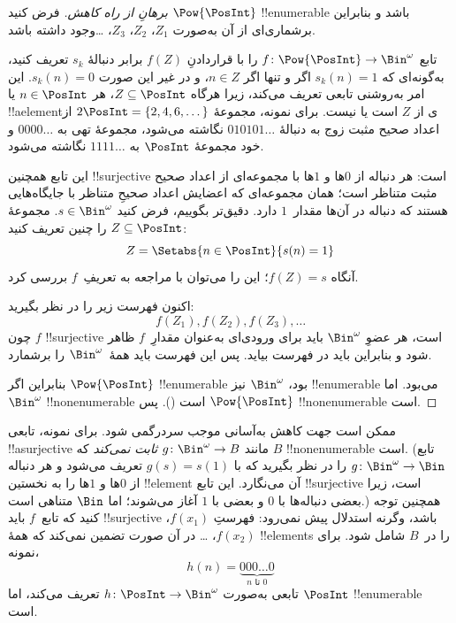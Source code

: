 \documentclass[../../../include/open-logic-section]{subfiles}
\begin{document}
\begin{proof}[برهانِ {} از راه کاهش]
فرض کنید $\Pow{\PosInt}$ !!{enumerable} باشد و بنابراین برشماری‌ای از
آن به‌صورت $Z_{1}$، $Z_{2}$، $Z_{3}$، \dots وجود داشته باشد.

تابع $f \colon \Pow{\PosInt} \to \Bin^\omega$ را با قراردادنِ
$f(Z)$ برابر دنبالهٔ $s_{k}$ تعریف کنید، به‌گونه‌ای که $s_{k}(n) = 1$ اگر و تنها
اگر $n \in Z$، و در غیر این صورت $s_k(n) = 0$. این امر به‌روشنی تابعی
تعریف می‌کند، زیرا هرگاه $Z \subseteq \PosInt$، هر $n \in \PosInt$ یا
!!a{element}ی از $Z$ است یا نیست. برای نمونه، مجموعهٔ $2\PosInt = \{2,
4, 6, \dots\}$ از اعداد صحیح مثبت زوج به دنبالهٔ $010101\dots$ نگاشته
می‌شود، مجموعهٔ تهی به $0000\dots$ و خود مجموعهٔ $\PosInt$ به
$1111\dots$ نگاشته می‌شود.

این تابع همچنین !!{surjective} است: هر دنباله از $0$ها و $1$ها با
مجموعه‌ای از اعداد صحیح مثبت متناظر است؛ همان مجموعه‌ای که اعضایش
اعداد صحیحِ متناظر با جایگاه‌هایی هستند که دنباله در آن‌ها مقدار~$1$
دارد. دقیق‌تر بگوییم، فرض کنید $s \in \Bin^\omega$. مجموعهٔ $Z
\subseteq \PosInt$ را چنین تعریف کنید:
\[
Z = \Setabs{n \in \PosInt}{s(n) = 1}
\]
آنگاه $f(Z) = s$؛ این را می‌توان با مراجعه به تعریفِ~$f$ بررسی کرد.

اکنون فهرست زیر را در نظر بگیرید:
\[
f(Z_1), f(Z_2), f(Z_3), \dots
\]
چون $f$ !!{surjective} است، هر عضوِ $\Bin^\omega$ باید برای ورودی‌ای
به‌عنوان مقدارِ~$f$ ظاهر شود و بنابراین باید در فهرست بیاید. پس این
فهرست باید همهٔ~$\Bin^\omega$ را برشمارد.

بنابراین اگر $\Pow{\PosInt}$ !!{enumerable} بود، $\Bin^\omega$ نیز
!!{enumerable} می‌بود. اما $\Bin^\omega$ !!{nonenumerable} است
(). پس $\Pow{\PosInt}$
!!{nonenumerable} است.
\end{proof}

\begin{explain}
ممکن است جهت کاهش به‌آسانی موجب سردرگمی شود. برای نمونه، تابعی
!!a{surjective} مانند $g \colon \Bin^\omega \to B$ \emph{ثابت نمی‌کند}
که $B$ !!{nonenumerable} است. (تابع $g
\colon \Bin^\omega \to \Bin$ را در نظر بگیرید که با $g(s) = s(1)$
تعریف می‌شود و هر دنباله از $0$ها و $1$ها را به نخستین !!{element} آن
می‌نگارد. این تابع !!{surjective} است، زیرا بعضی دنباله‌ها با $0$ و
بعضی با $1$ آغاز می‌شوند؛ اما $\Bin$ متناهی است.) همچنین توجه کنید که
تابع~$f$ باید !!{surjective} باشد، وگرنه استدلال پیش نمی‌رود:
فهرستِ $f(x_1)$، $f(x_2)$، \dots{} در آن صورت تضمین نمی‌کند که همهٔ
!!{element}s را در~$B$ شامل شود. برای نمونه،
\[
h(n) = \underbrace{000\dots0}_{\text{$n$ تا $0$}}
\]
تابعی به‌صورت $h\colon \PosInt \to
\Bin^\omega$ تعریف می‌کند، اما $\PosInt$ !!{enumerable} است.
\end{explain}
\end{document}
